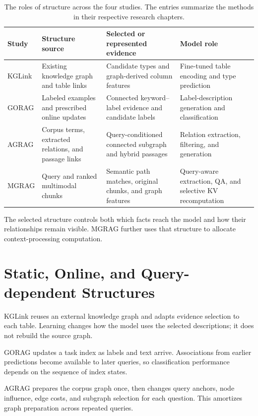 \begin{table}[tbp]
\centering\small
\caption{The roles of structure across the four studies. The entries summarize the methods in their respective research chapters.}
\label{tab:discussion:roles}
\begin{tabular}{>{\raggedright\arraybackslash}p{}>{\raggedright\arraybackslash}p{}>{\raggedright\arraybackslash}p{}>{\raggedright\arraybackslash}p{}}
\toprule
Study & Structure source & Selected or represented evidence & Model role\\
\midrule
KGLink & Existing knowledge graph and table links & Candidate types and graph-derived column features & Fine-tuned table encoding and type prediction\\
GORAG & Labeled examples and prescribed online updates & Connected keyword--label evidence and candidate labels & Label-description generation and classification\\
AGRAG & Corpus terms, extracted relations, and passage links & Query-conditioned connected subgraph and hybrid passages & Relation extraction, filtering, and generation\\
MGRAG & Query and ranked multimodal chunks & Semantic path matches, original chunks, and graph features & Query-aware extraction, QA, and selective KV recomputation\\
\bottomrule
\end{tabular}
\end{table}

The selected structure controls both which facts reach the model and how their relationships remain visible. MGRAG further uses that structure to allocate context-processing computation.

\section{Static, Online, and Query-dependent Structures}
\label{sec:discussion:adaptation}
KGLink reuses an external knowledge graph and adapts evidence selection to each table. Learning changes how the model uses the selected descriptions; it does not rebuild the source graph.

GORAG updates a task index as labels and text arrive. Associations from earlier predictions become available to later queries, so classification performance depends on the sequence of index states.

AGRAG prepares the corpus graph once, then changes query anchors, node influence, edge costs, and subgraph selection for each question. This amortizes graph preparation across repeated queries.


